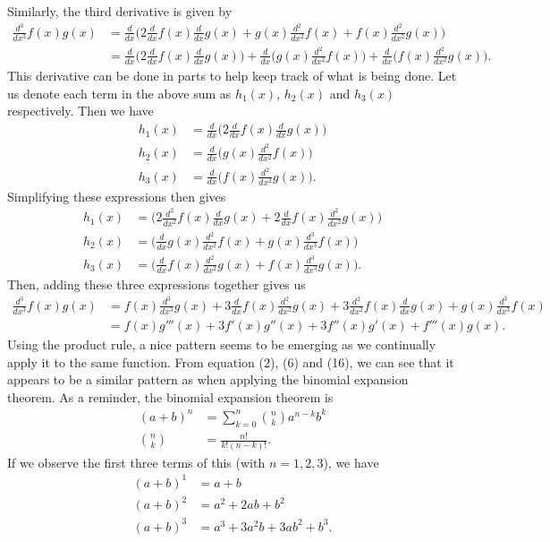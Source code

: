 Similarly, the third derivative is given by
\begin{align}
	\frac{d^3}{dx^3}f(x)g(x)&=\frac{d}{dx}\bigg(2\frac{d}{dx}f(x)\frac{d}{dx}g(x)+g(x)\frac{d^2}{dx^2}f(x)+f(x)\frac{d^2}{dx^2}g(x)\bigg) \\
	&=\frac{d}{dx}\bigg(2\frac{d}{dx}f(x)\frac{d}{dx}g(x)\bigg)+\frac{d}{dx}\bigg(g(x)\frac{d^2}{dx^2}f(x)\bigg)+\frac{d}{dx}\bigg(f(x)\frac{d^2}{dx^2}g(x)\bigg).
\end{align}
This derivative can be done in parts to help keep track of what is being done. Let us denote each term in the above sum as $h_1(x)$, $h_2(x)$ and $h_3(x)$ respectively. Then we have
\begin{align}
	h_1(x)&= \frac{d}{dx}\bigg(2\frac{d}{dx}f(x)\frac{d}{dx}g(x)\bigg) \\
	h_2(x)&=\frac{d}{dx}\bigg(g(x)\frac{d^2}{dx^2}f(x)\bigg) \\
	h_3(x)&=\frac{d}{dx}\bigg(f(x)\frac{d^2}{dx^2}g(x)\bigg).
\end{align}
Simplifying these expressions then gives
\begin{align}
	h_1(x)&= \bigg(2\frac{d^2}{dx^2}f(x)\frac{d}{dx}g(x)+2\frac{d}{dx}f(x)\frac{d^2}{dx^2}g(x)\bigg) \\
	h_2(x)&=\bigg(\frac{d}{dx}g(x)\frac{d^2}{dx^2}f(x)+g(x)\frac{d^3}{dx^3}f(x)\bigg) \\
	h_3(x)&=\bigg(\frac{d}{dx}f(x)\frac{d^2}{dx^2}g(x)+f(x)\frac{d^3}{dx^3}g(x)\bigg).
\end{align}
Then, adding these three expressions together gives us
\begin{align}
	\frac{d^3}{dx^3}f(x)g(x)&=f(x)\frac{d^3}{dx^3}g(x)+3\frac{d}{dx}f(x)\frac{d^2}{dx^2}g(x)+3\frac{d^2}{dx^2}f(x)\frac{d}{dx}g(x)+g(x)\frac{d^3}{dx^3}f(x)\\
	&=f(x)g'''(x)+3f'(x)g''(x)+3f''(x)g'(x)+f'''(x)g(x). \label{product_rule_n3}
\end{align}
Using the product rule, a nice pattern seems to be emerging as we continually apply it to the same function. From equation (2), (6) and (16), we can see that it appears to be a similar pattern as when applying the binomial expansion theorem. As a reminder, the binomial expansion theorem is
\begin{align}
	(a+b)^n&=\sum_{k=0}^{n}{{n}\choose{k}}a^{n-k}b^k \\
	{{n}\choose{k}}&= \frac{n!}{k!(n-k)!}.
\end{align}
If we observe the first three terms of this (with $n=1,2,3$), we have
\begin{align}
	(a+b)^1&=a+b\\
	(a+b)^2&= a^2+2ab+b^2 \\
	(a+b)^3 &= a^3+3a^2b+3ab^2+b^3.
\end{align}
